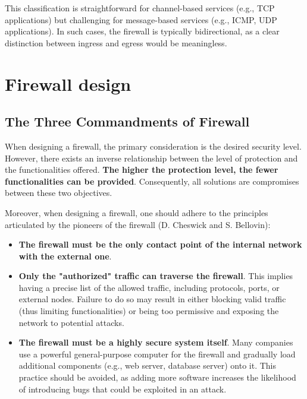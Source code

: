 This classification is straightforward for channel-based services (e.g., TCP applications) but challenging for message-based services (e.g., ICMP, UDP applications). In such cases, the firewall is typically bidirectional, as a clear distinction between ingress and egress would be meaningless.


\section{Firewall design}


\subsection{The Three Commandments of Firewall}
When designing a firewall, the primary consideration is the desired security level. However, there exists an inverse relationship between the level of protection and the functionalities offered. \textbf{The higher the protection level, the fewer functionalities can be provided}.
Consequently, all solutions are compromises between these two objectives.

Moreover, when designing a firewall, one should adhere to the principles articulated by the pioneers of the firewall (D. Cheswick and S. Bellovin):


\begin{itemize}
	\item [I.] \textbf{The firewall must be the only contact point of the internal network with the external one}.
	\item [II.] \textbf{Only the "authorized" traffic can traverse the firewall}. This implies having a precise list of the allowed traffic, including protocols, ports, or external nodes. Failure to do so may result in either blocking valid traffic (thus limiting functionalities) or being too permissive and exposing the network to potential attacks.
	\item [III.] \textbf{The firewall must be a highly secure system itself}. Many companies use a powerful general-purpose computer for the firewall and gradually load additional components (e.g., web server, database server) onto it. This practice should be avoided, as adding more software increases the likelihood of introducing bugs that could be exploited in an attack.
\end{itemize}

